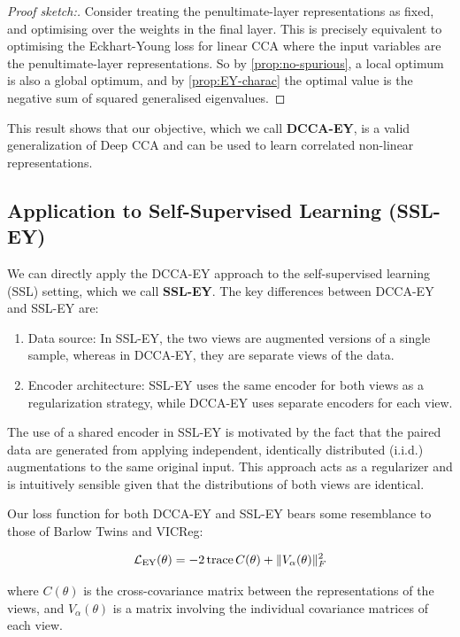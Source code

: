 \begin{proof}[Proof sketch:]
    Consider treating the penultimate-layer representations as fixed, and optimising over the weights in the final layer.
    This is precisely equivalent to optimising the Eckhart-Young loss for linear CCA where the input variables are the penultimate-layer representations.
    So by \cref{prop:no-spurious}, a local optimum is also a global optimum, and by \cref{prop:EY-charac} the optimal value is the negative sum of squared generalised eigenvalues.
\end{proof}

This result shows that our objective, which we call \textbf{DCCA-EY}, is a valid generalization of Deep CCA and can be used to learn correlated non-linear representations.

\subsection{Application to Self-Supervised Learning (SSL-EY)}

We can directly apply the DCCA-EY approach to the self-supervised learning (SSL) setting, which we call \textbf{SSL-EY}. The key differences between DCCA-EY and SSL-EY are:

\begin{enumerate}
    \item Data source: In SSL-EY, the two views are augmented versions of a single sample, whereas in DCCA-EY, they are separate views of the data.
    \item Encoder architecture: SSL-EY uses the same encoder for both views as a regularization strategy, while DCCA-EY uses separate encoders for each view.
\end{enumerate}

The use of a shared encoder in SSL-EY is motivated by the fact that the paired data are generated from applying independent, identically distributed (i.i.d.) augmentations to the same original input. This approach acts as a regularizer and is intuitively sensible given that the distributions of both views are identical.

Our loss function for both DCCA-EY and SSL-EY bears some resemblance to those of Barlow Twins and VICReg:

\begin{align*}
    \mathcal{L}_\text{EY}(\theta) = - 2 \operatorname{trace} C(\theta) + \lVert V_\alpha(\theta)\rVert_F^2
\end{align*}

where $C(\theta)$ is the cross-covariance matrix between the representations of the views, and $V_\alpha(\theta)$ is a matrix involving the individual covariance matrices of each view.

